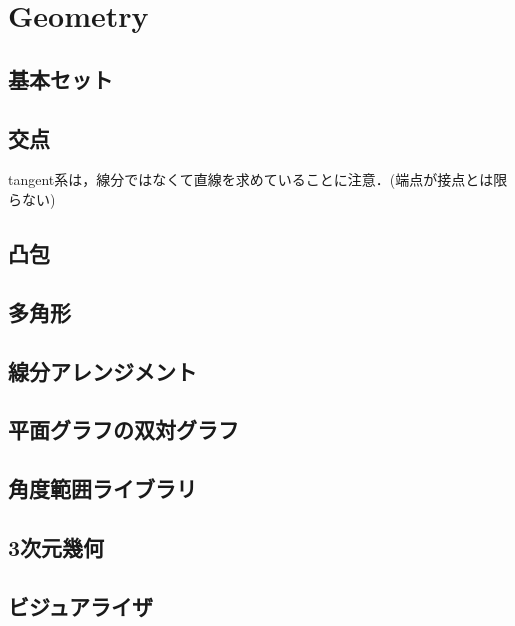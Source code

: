 \section{Geometry}

\subsection{基本セット}


\subsection{交点}
tangent系は，線分ではなくて直線を求めていることに注意．(端点が接点とは限らない)


\subsection{凸包}


\subsection{多角形}


\subsection{線分アレンジメント}


\subsection{平面グラフの双対グラフ}


\subsection{角度範囲ライブラリ}


\subsection{3次元幾何}


\subsection{ビジュアライザ}


